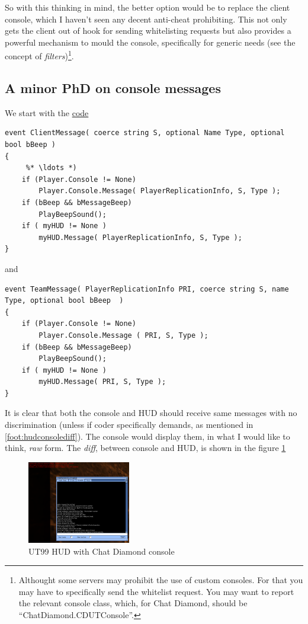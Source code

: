 \documentclass{article}
\theoremstyle{definition}
\begin{document}
So with this thinking in mind, the better option would be to replace the client console, which I haven't seen any decent anti-cheat prohibiting. This not only gets the client out of hook for sending whitelisting requests but also provides a powerful mechanism to mould the console, specifically for generic needs (see the concept of \emph{filters})\footnote{Althought some servers may prohibit the use of custom consoles.  For that you may have to specifically send the whitelist request. You may want to report the relevant console class, which, for Chat Diamond, should be ``ChatDiamond.CDUTConsole''.}.

\subsection{A minor PhD on console messages}

We start with the \href{http://uncodex.ut-files.com/UT/v436/Source_engine/playerpawn.html}{code} 

\begin{lstlisting}[frame=single]
event ClientMessage( coerce string S, optional Name Type, optional bool bBeep )
{
     %* \ldots *)    
    if (Player.Console != None)
        Player.Console.Message( PlayerReplicationInfo, S, Type );
    if (bBeep && bMessageBeep)
        PlayBeepSound();
    if ( myHUD != None )
        myHUD.Message( PlayerReplicationInfo, S, Type );
}       
\end{lstlisting}
and
\begin{lstlisting}[frame=single]
event TeamMessage( PlayerReplicationInfo PRI, coerce string S, name Type, optional bool bBeep  )
{
    if (Player.Console != None)
        Player.Console.Message ( PRI, S, Type );
    if (bBeep && bMessageBeep)
        PlayBeepSound();
    if ( myHUD != None )
        myHUD.Message( PRI, S, Type );
}     
\end{lstlisting}

It is clear that both the console and HUD should receive same messages with no discrimination (unless if coder specifically demands, as mentioned in \ref{foot:hudconsolediff}).  The console would display them, in what I would like to think, \emph{raw} form.  The \emph{diff}, between console and HUD, is shown in the figure \ref{fig:chatdiamond_console_hud}

\begin{figure}
\centering
\includegraphics[width=0.4\textwidth]{consoleundhud}
\caption{UT99 HUD with Chat Diamond console}
\label{fig:chatdiamond_console_hud}
\end{figure}
\end{document}
